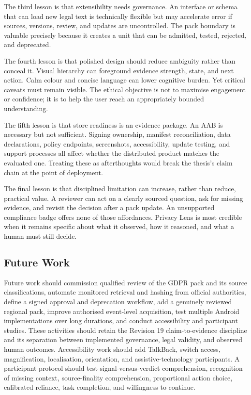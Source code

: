 The third lesson is that extensibility needs governance. An interface or schema that can load new legal text is technically flexible but may accelerate error if sources, versions, review, and updates are uncontrolled. The pack boundary is valuable precisely because it creates a unit that can be admitted, tested, rejected, and deprecated.

The fourth lesson is that polished design should reduce ambiguity rather than conceal it. Visual hierarchy can foreground evidence strength, state, and next action. Calm colour and concise language can lower cognitive burden. Yet critical caveats must remain visible. The ethical objective is not to maximise engagement or confidence; it is to help the user reach an appropriately bounded understanding.

The fifth lesson is that store readiness is an evidence package. An AAB is necessary but not sufficient. Signing ownership, manifest reconciliation, data declarations, policy endpoints, screenshots, accessibility, update testing, and support processes all affect whether the distributed product matches the evaluated one. Treating these as afterthoughts would break the thesis's claim chain at the point of deployment.

The final lesson is that disciplined limitation can increase, rather than reduce, practical value. A reviewer can act on a clearly sourced question, ask for missing evidence, and revisit the decision after a pack update. An unsupported compliance badge offers none of those affordances. Privacy Lens is most credible when it remains specific about what it observed, how it reasoned, and what a human must still decide.

\subsection{Future Work}

Future work should commission qualified review of the GDPR pack and its source classifications, automate monitored retrieval and hashing from official authorities, define a signed approval and deprecation workflow, add a genuinely reviewed regional pack, improve authorised event-level acquisition, test multiple Android implementations over long durations, and conduct accessibility and participant studies. These activities should retain the Revision 19 claim-to-evidence discipline and its separation between implemented governance, legal validity, and observed human outcomes. Accessibility work should add TalkBack, switch access, magnification, localisation, orientation, and assistive-technology participants. A participant protocol should test signal-versus-verdict comprehension, recognition of missing context, source-finality comprehension, proportional action choice, calibrated reliance, task completion, and willingness to continue.

